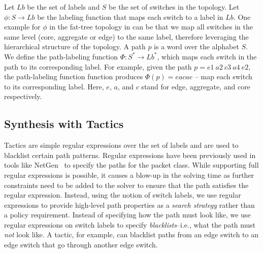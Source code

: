  Let $Lb$ be the set of labels and $S$ be the set of switches in the topology. Let $\phi : S \rightarrow Lb$ be the labeling function that maps each switch to a label in $Lb$. One example for $\phi$ in the fat-tree topology in  can be that we map all switches in the same level (core, aggregate or edge) to the same label,
therefore leveraging the hierarchical structure of the topology. A path $p$ is a word over the alphabet $S$. 
We define the path-labeling function $\Phi : S^* \rightarrow Lb^*$,  which maps each switch in the path to its corresponding 
 label. 
 For example, given the path $p = e1\ a2\ c3\ a4\ e2$, the path-labeling function function produces $\Phi(p) = eacae$ -- map each switch to its corresponding label.
 Here, $e$, $a$, and $c$ stand for edge, aggregate, and core respectively.

\subsection{Synthesis with Tactics}
Tactics are simple regular expressions over the set
 of labels and are used to blacklist certain path patterns.
Regular expressions have been previously used in tools like
NetGen~\cite{netgen} to specify the paths for the packet class.
While supporting full regular expressions is possible, it causes a blow-up in the solving time as further
constraints need to be added to the solver to ensure that the path satisfies the regular expression. 
Instead, using the notion of switch labels, we use regular expressions to provide high-level path properties as a {\em search strategy} rather than a policy requirement. 
Instead of specifying how the path must look like, we use regular expressions on switch labels to specify \emph{blacklists}--i.e.,
what the path must \emph{not} look like. A tactic, for example, can blacklist paths from an edge switch to an edge switch that go through another edge switch. 

